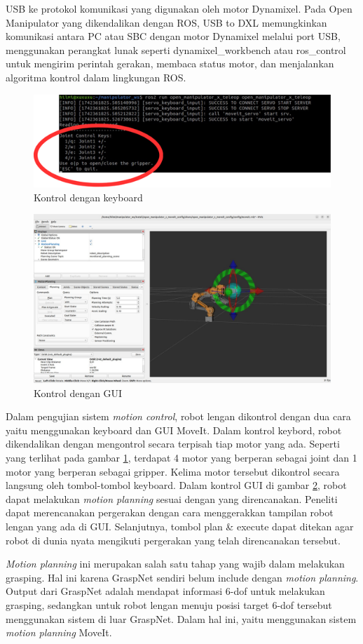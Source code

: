 USB ke protokol komunikasi yang digunakan oleh motor Dynamixel. Pada Open Manipulator yang dikendalikan dengan ROS,
USB to DXL memungkinkan komunikasi antara PC atau SBC dengan motor Dynamixel melalui port USB, menggunakan perangkat lunak
seperti dynamixel\_workbench atau ros\_control untuk mengirim perintah gerakan,
membaca status motor, dan menjalankan algoritma kontrol dalam lingkungan ROS.
\begin{figure} [H] \centering
    \includegraphics[scale=0.8]{gambar/keyboard control anotated.png}
    \caption{Kontrol dengan keyboard}
    \label{fig:keyboard_control}
  \end{figure}
\begin{figure} [H] \centering
    \includegraphics[scale=0.3]{gambar/moveit gui.jpeg}
    \caption{Kontrol dengan GUI}
    \label{fig:moveit_gui}
\end{figure}
Dalam pengujian sistem \emph{motion control}, robot lengan dikontrol dengan dua cara yaitu menggunakan keyboard dan GUI MoveIt.
Dalam kontrol keybord, robot dikendalikan dengan mengontrol secara terpisah tiap motor yang ada.
Seperti yang terlihat pada gambar \ref{fig:keyboard_control}, terdapat 4 motor yang berperan sebagai joint
dan 1 motor yang berperan sebagai gripper. Kelima motor tersebut dikontrol secara langsung oleh tombol-tombol keyboard.
Dalam kontrol GUI di gambar \ref{fig:moveit_gui}, robot dapat melakukan \emph{motion planning} sesuai dengan yang direncanakan.
Peneliti dapat merencanakan pergerakan dengan cara menggerakkan tampilan robot lengan yang ada di GUI. Selanjutnya,
tombol plan \& execute dapat ditekan agar robot di dunia nyata mengikuti pergerakan yang telah direncanakan tersebut.

\emph{Motion planning} ini merupakan salah satu tahap yang wajib dalam melakukan grasping.
Hal ini karena GraspNet sendiri belum include dengan \emph{motion planning}. Output dari GraspNet
adalah mendapat informasi 6-dof untuk melakukan grasping, sedangkan untuk robot lengan menuju posisi
target 6-dof tersebut menggunakan sistem di luar GraspNet. Dalam hal ini, yaitu menggunakan sistem \emph{motion
planning} MoveIt.